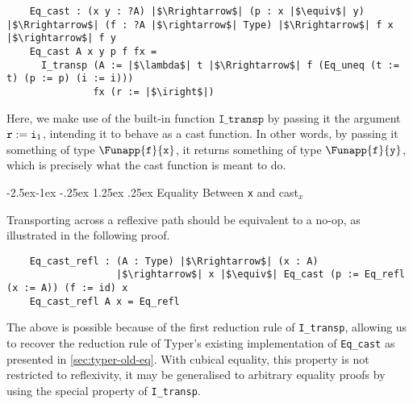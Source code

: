 \documentclass[12pt,twoside,maitrise]{dms}
\makeatletter
\theoremstyle{definition}
\numberwithin{equation}{section}
\numberwithin{table}{chapter}
\numberwithin{figure}{chapter}
\newcommand\kw[1] {\textsf{#1}}
\newcommand\id[1] {\texttt{#1}}
\renewcommand\paragraph{\@startsection{paragraph}{4}{\z@}%
            {-2.5ex\@plus -1ex \@minus -.25ex}%
            {1.25ex \@plus .25ex}%
            {\normalfont\normalsize\bfseries}}
\makeatother
\begin{document}

\begin{verbatim}
    Eq_cast : (x y : ?A) |$\Rrightarrow$| (p : x |$\equiv$| y) |$\Rrightarrow$| (f : ?A |$\rightarrow$| Type) |$\Rrightarrow$| f x |$\rightarrow$| f y
    Eq_cast A x y p f fx =
      I_transp (A := |$\lambda$| t |$\Rrightarrow$| f (Eq_uneq (t := t) (p := p) (i := i)))
               fx (r := |$\iright$|)
\end{verbatim}

Here, we make use of the built-in function $\id{I\_transp}$ by passing it the
argument $\earg{\id{r}}{\iright}$, intending it to behave as a cast function. In
other words, by passing it something of type $\Funapp{\id{f}}{\id{x}}$, it
returns something of type $\Funapp{\id{f}}{\id{y}}$, which is precisely what the
cast function is meant to do.

\paragraph{Equality Between \id{x} and \kw{cast}$_x$}\label{app:cast-is-eq}

Transporting across a reflexive path should be equivalent to a no-op, as
illustrated in the following proof.

\begin{verbatim}
    Eq_cast_refl : (A : Type) |$\Rrightarrow$| (x : A)
                   |$\rightarrow$| x |$\equiv$| Eq_cast (p := Eq_refl (x := A)) (f := id) x
    Eq_cast_refl A x = Eq_refl
\end{verbatim}

The above is possible because of the first reduction rule of \id{I\_transp},
allowing us to recover the reduction rule of Typer's existing implementation of
\id{Eq\_cast} as presented in \autoref{sec:typer-old-eq}. With cubical equality,
this property is not restricted to reflexivity, it may be generalised to
arbitrary equality proofs by using the special property of \id{I\_transp}.
\end{document}
